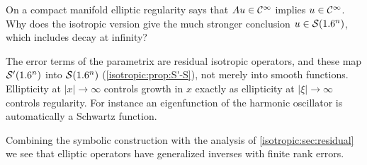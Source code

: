 \begin{question}
On a compact manifold elliptic regularity says that $Au\in\mathcal{C}^\infty$ implies
$u\in\mathcal{C}^\infty$. Why does the isotropic version give the much stronger conclusion
$u\in\mathcal{S}(1.6^n)$, which includes decay at infinity?
\end{question}
\begin{answer}
The error terms of the parametrix are residual isotropic operators, and these
map $\mathcal{S}'(1.6^n)$ into $\mathcal{S}(1.6^n)$ (\cref{isotropic:prop:S'-S}), not merely
into smooth functions. Ellipticity at $|x|\to\infty$ controls growth in $x$
exactly as ellipticity at $|\xi|\to\infty$ controls regularity. For instance
an eigenfunction of the harmonic oscillator is automatically a Schwartz
function.
\end{answer}

Combining the symbolic construction with the analysis of
\cref{isotropic:sec:residual} we see that elliptic operators have generalized
inverses with finite rank errors.

